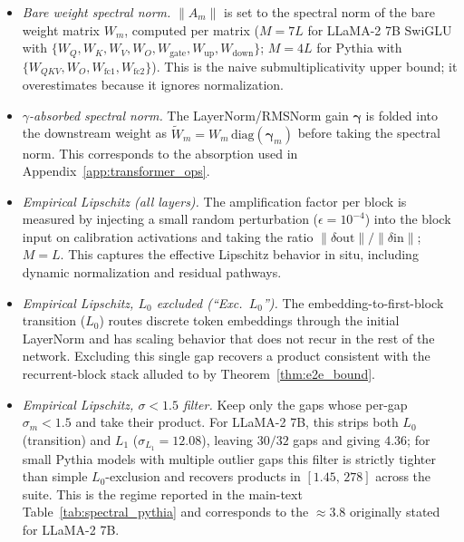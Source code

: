 \documentclass{article}
\theoremstyle{plain}
\theoremstyle{definition}
\theoremstyle{remark}
\begin{document}
\begin{itemize}
  \item \emph{Bare weight spectral norm.}
        $\|A_m\|$ is set to the spectral norm of the bare weight matrix
        $W_m$, computed per matrix ($M=7L$ for LLaMA-2 7B SwiGLU with
        $\{W_Q,W_K,W_V,W_O,W_{\text{gate}},W_{\text{up}},W_{\text{down}}\}$;
        $M=4L$ for Pythia with
        $\{W_{QKV},W_O,W_{\text{fc1}},W_{\text{fc2}}\}$). This is the
        naive submultiplicativity upper bound; it overestimates because
        it ignores normalization.
  \item \emph{$\gamma$-absorbed spectral norm.}
        The LayerNorm/RMSNorm gain $\boldsymbol{\gamma}$ is folded into
        the downstream weight as
        $\tilde{W}_m = W_m\,\mathrm{diag}(\boldsymbol{\gamma}_m)$ before
        taking the spectral norm. This corresponds to the absorption used
        in Appendix~\ref{app:transformer_ops}.
  \item \emph{Empirical Lipschitz (all layers).}
        The amplification factor per block is measured by injecting a
        small random perturbation ($\epsilon=10^{-4}$) into the block input
        on calibration activations and taking the ratio
        $\|\delta\mathrm{out}\|/\|\delta\mathrm{in}\|$; $M=L$. This
        captures the effective Lipschitz behavior in situ, including
        dynamic normalization and residual pathways.
  \item \emph{Empirical Lipschitz, $L_0$ excluded (``Exc.\ $L_0$'').}
        The embedding-to-first-block transition ($L_0$) routes discrete
        token embeddings through the initial LayerNorm and has scaling
        behavior that does not recur in the rest of the network.
        Excluding this single gap recovers a product consistent with the
        recurrent-block stack alluded to by Theorem~\ref{thm:e2e_bound}.
  \item \emph{Empirical Lipschitz, $\sigma<1.5$ filter.}
        Keep only the gaps whose per-gap $\sigma_m<1.5$ and take their
        product. For LLaMA-2 7B, this strips both $L_0$ (transition) and
        $L_1$ ($\sigma_{L_1}=12.08$), leaving $30/32$ gaps and giving
        $4.36$; for small Pythia models with multiple outlier gaps this
        filter is strictly tighter than simple $L_0$-exclusion and
        recovers products in $[1.45,\,278]$ across the suite. This is the
        regime reported in the main-text
        Table~\ref{tab:spectral_pythia} and corresponds to the $\approx
        3.8$ originally stated for LLaMA-2 7B.
\end{itemize}
\end{document}
